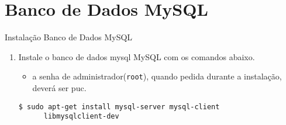 \section{Banco de Dados MySQL}
\begin{frame}{Instalação Banco de Dados MySQL}
  \begin{enumerate}
    \item Instale o banco de dados mysql MySQL com os comandos abaixo.
    \begin{itemize}
     \item a senha de administrador(\verb!root!), quando pedida durante a instalação, deverá ser \alert{puc}. 
    \end{itemize}   
    \begin{lstlisting}[style=BashInputStyle]
      $ sudo apt-get install mysql-server mysql-client 
	  libmysqlclient-dev
    \end{lstlisting}
  \end{enumerate}
\end{frame}